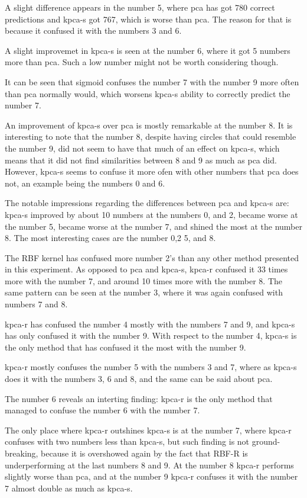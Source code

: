 A slight difference appears in the number 5, where \gls{pca} has got 780 correct predictions and \gls{kpca-s} got 767, which is worse than \gls{pca}. The reason for that is because it confused it with the numbers 3 and 6.


A slight improvemet in \gls{kpca-s} is seen at the number 6, where it got 5 numbers more than \gls{pca}. Such a low number might not be worth considering though.

It can be seen that sigmoid confuses the number 7 with the number 9 more often than \gls{pca} normally would, which worsens \gls{kpca-s} ability to correctly predict the number 7.

An improvement of \gls{kpca-s} over \gls{pca} is mostly remarkable at the number 8. It is interesting to note that the number 8, despite having circles that could resemble the number 9, did not seem to have that much of an effect on \gls{kpca-s}, which means that it did not find similarities between 8 and 9 as much as \gls{pca} did. However, \gls{kpca-s} seems to confuse it more ofen with other numbers that \gls{pca} does not, an example being the numbers 0 and 6.


The notable impressions regarding the differences between \gls{pca} and \gls{kpca-s} are: \gls{kpca-s} improved by about 10 numbers at the numbers 0, and 2, became worse at the number 5, became worse at the number 7, and shined the most at the number 8. The most interesting cases are the number 0,2 5, and 8.


The RBF kernel has confused more number 2's than any other method presented in this experiment. As opposed to \gls{pca} and \gls{kpca-s}, \gls{kpca-r} confused it 33 times more with the number 7, and around 10 times more with the number 8. The same pattern can be seen at the number 3, where it was again confused with numbers 7 and 8.


\gls{kpca-r} has confused the number 4 mostly with the numbers 7 and 9, and \gls{kpca-s} has only confused it with the number 9. With respect to the number 4, \gls{kpca-s} is the only method that has confused it the most with the number 9.


\gls{kpca-r} mostly confuses the number 5 with the numbers 3 and 7, where as \gls{kpca-s} does it with the numbers 3, 6 and 8, and the same can be said about \gls{pca}.


The number 6 reveals an interting finding: \gls{kpca-r} is the only method that managed to confuse the number 6 with the number 7.

The only place where \gls{kpca-r} outshines \gls{kpca-s} is at the number 7, where \gls{kpca-r} confuses with two numbers less than \gls{kpca-s}, but such finding is not ground-breaking, because it is overshowed again by the fact that RBF-R is underperforming at the last numbers 8 and 9. At the number 8 \gls{kpca-r} performs slightly worse than \gls{pca}, and at the number 9 \gls{kpca-r} confuses it with the number 7 almost double as much as \gls{kpca-s}.


